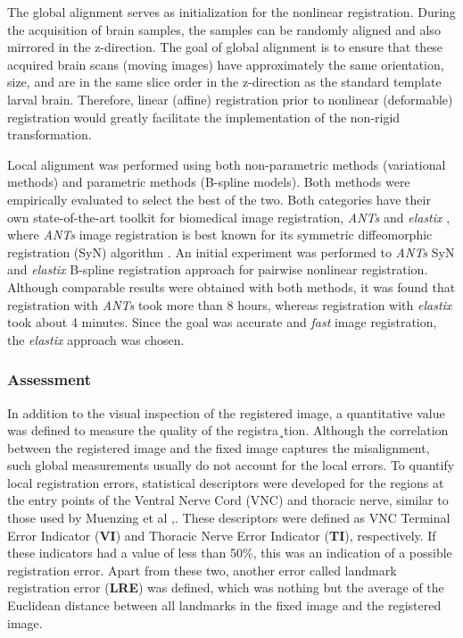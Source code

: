 \documentclass{report}
\begin{document}
	The global alignment serves as initialization for the nonlinear registration. During the acquisition of brain samples, the samples can be randomly aligned and also mirrored in the z-direction. The goal of global alignment is to ensure that these acquired brain scans (moving images) have approximately the same orientation, size, and are in the same slice order in the z-direction as the standard template larval brain.  Therefore, linear (affine) registration prior to nonlinear (deformable) registration would greatly facilitate the implementation of the non-rigid transformation.
	
	Local alignment was performed using both non-parametric methods (variational methods) and parametric methods (B-spline models). Both methods were empirically evaluated to select the best of the two. Both categories have their own state-of-the-art toolkit for biomedical image registration, \emph{ANTs} \cite{Avants2011ARE} and \emph{elastix} \cite{5338015}, where \emph{ANTs} image registration is best known for its symmetric diffeomorphic registration (SyN) algorithm \cite{Avants2008SymmetricDI}. An initial experiment was performed to \emph{ANTs} SyN and \emph{elastix} B-spline registration approach for pairwise nonlinear registration. Although comparable results were obtained with both methods, it was found that registration with \emph{ANTs} took more than 8 hours, whereas registration with \emph{elastix} took about 4 minutes. Since the goal was accurate and \emph{fast} image registration, the \emph{elastix} approach was chosen.
	
	\subsubsection{Assessment}
	\label{subsubsection:assessment}
	In addition to the visual inspection of the registered image, a quantitative value was defined to measure the quality of the registra¸tion. Although the correlation between the registered image and the fixed image captures the misalignment, such global measurements usually do not account for the local errors. To quantify local registration errors, statistical descriptors were developed for the regions at the entry points of the Ventral Nerve Cord (VNC) and thoracic nerve, similar to those used by Muenzing et al \cite{Muenzing},. These descriptors were defined as VNC Terminal Error Indicator (\textbf{VI}) and Thoracic Nerve Error Indicator (\textbf{TI}), respectively. If these indicators had a value of less than 50\%, this was an indication of a possible registration error. Apart from these two, another error called landmark registration error (\textbf{LRE}) was defined, which was nothing but the average of the Euclidean distance between all landmarks in the fixed image and the registered image.
	
\end{document}
